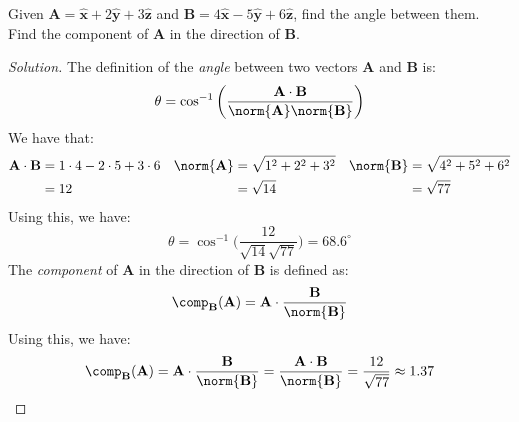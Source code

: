 \documentclass[crop=false,class=article,oneside]{standalone}
\begin{document}
        \begin{problem}[Wangsness 1-4]
            Given
            $\mathbf{A}%
             =\hat{\mathbf{x}}+2\hat{\mathbf{y}}%
             +3\hat{\mathbf{z}}$
            and
            $\mathbf{B}%
             =4\hat{\mathbf{x}}-5\hat{\mathbf{y}}%
             +6\hat{\mathbf{z}}$,
            find the angle between them. Find the component of
            $\mathbf{A}$ in the direction of $\mathbf{B}$.
        \end{problem}
        \begin{proof}[Solution]
            The definition of the \textit{angle}
            between two vectors
            $\mathbf{A}$ and $\mathbf{B}$ is:
            \begin{equation*}
                \theta=
                \cos^{-1}\bigg(
                    \frac{\mathbf{A}\cdot\mathbf{B}}
                    {\norm{\mathbf{A}}\norm{\mathbf{B}}}
                \bigg)
            \end{equation*}
            We have that:
            \begin{align*}
                \mathbf{A}\cdot\mathbf{B}
                &=1\cdot4-2\cdot5+3\cdot6
                &
                \norm{\mathbf{A}}
                &=\sqrt{1^{2}+2^{2}+3^{2}}
                &
                \norm{\mathbf{B}}
                &=\sqrt{4^{2}+5^{2}+6^{2}}\\
                &=12
                &
                &=\sqrt{14}
                &
                &=\sqrt{77}\\
            \end{align*}
            Using this, we have:
            \begin{equation*}
                \theta=\cos^{-1}\bigg(
                    \frac{12}{\sqrt{14}{\sqrt{77}}}
                \bigg)
                =68.6^{\circ}
            \end{equation*}
            The \textit{component} of $\mathbf{A}$
            in the direction of
            $\mathbf{B}$ is defined as:
            \begin{equation*}
                \comp_{\mathbf{B}}(\mathbf{A})
                =\mathbf{A}\cdot\frac{\mathbf{B}}
                    {\norm{\mathbf{B}}}
            \end{equation*}
            Using this, we have:
            \begin{equation*}
                \comp_{\mathbf{B}}(\mathbf{A})
                =\mathbf{A}\cdot\frac{\mathbf{B}}
                    {\norm{\mathbf{B}}}
                =\frac{\mathbf{A}
                    \cdot\mathbf{B}}{\norm{\mathbf{B}}}
                =\frac{12}{\sqrt{77}}
                \approx{1.37}
            \end{equation*}
        \end{proof}
\end{document}
